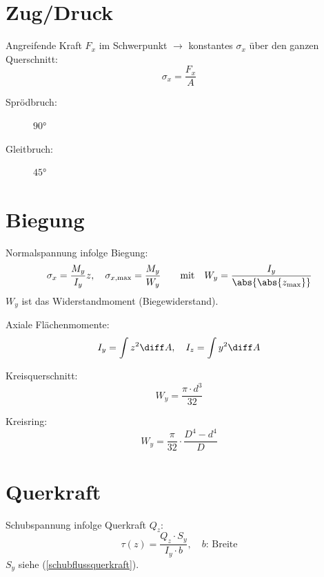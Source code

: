 
\section{Zug/Druck} %
	Angreifende Kraft $F_x$ im Schwerpunkt $\rightarrow$ konstantes $\sigma_x$ über den ganzen Querschnitt:
	\begin{equation*}
		\sigma_x = \frac{F_x}{A}
	\end{equation*}
	\begin{description}
		\item[Sprödbruch:] $\ang{90}$
		\item[Gleitbruch:] $\ang{45}$
	\end{description}
\section{Biegung} %
	Normalspannung infolge Biegung:
	\begin{equation*}
		\sigma_x = \frac{M_y}{I_y}z, \quad \sigma_{x\text{,max}}= \frac{M_y}{W_y} \qquad \text{mit}\quad W_y = \frac{I_y}{\abs{\abs{z_{\text{max}}}}}
	\end{equation*}
	$W_y$ ist das Widerstandmoment (Biegewiderstand).
	
	Axiale Flächenmomente:
	\begin{equation*}
		I_y = \int z^2 \diff A, \quad I_z = \int y^2 \diff A
	\end{equation*}
	
	Kreisquerschnitt:
	\begin{equation*}
		W_y = \frac{\pi \cdot d^3}{32}
	\end{equation*}
	
	Kreisring:
	\begin{equation*}
		W_y = \frac{\pi}{32}\cdot \frac{D^4-d^4}{D}
	\end{equation*}
\section{Querkraft} %
	Schubspannung infolge Querkraft $Q_z$:
	\begin{equation*}
		\tau(z) = \frac{Q_z \cdot S_y}{I_y\cdot b}, \quad b\text{: Breite}
	\end{equation*}
	$S_y$ siehe (\ref{schubflussquerkraft}).
	
